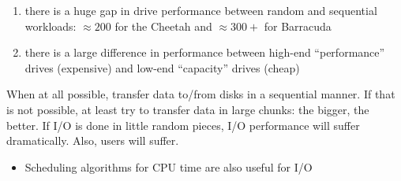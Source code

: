 \begin{enumerate}
\item there is a huge gap in drive performance between random and sequential workloads: $\approx 200$ for the Cheetah and $\approx 300+$ for Barracuda
\item there is a large difference in performance between high-end ``performance'' drives (expensive) and low-end ``capacity'' drives (cheap)
\end{enumerate}
\begin{tcolorbox}[left=0mm, top=1mm, right=0mm, rightlower=0mm, bottom=1mm,
  title= Use Disks Sequentially,
  halign title=center]
  When at all possible, transfer data to/from disks in a sequential manner. If that is not possible, at least try to transfer data
in large chunks: the bigger, the better. If I/O is done in little random
pieces, I/O performance will suffer dramatically. Also, users will suffer.
\end{tcolorbox}
\begin{itemize}
\item Scheduling algorithms for CPU time are also useful for I/O
\end{itemize}
